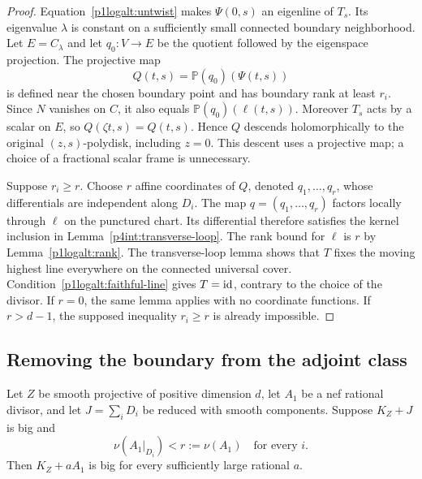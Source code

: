 \begin{proof}
Equation~\eqref{p1logalt:untwist} makes $\Psi(0,s)$ an eigenline of $T_s$.
Its eigenvalue $\lambda$ is constant on a sufficiently small connected
boundary neighborhood.  Let $E=C_\lambda$ and let $q_0:V\to E$ be the
quotient followed by the eigenspace projection.  The projective map
\[
 Q(t,s)=\mathbb P(q_0)(\Psi(t,s))
\]
is defined near the chosen boundary point and has boundary rank at
least $r_i$.  Since $N$ vanishes on $C$, it also equals
$\mathbb P(q_0)(\ell(t,s))$.  Moreover $T_s$ acts by a scalar on $E$,
so $Q(\zeta t,s)=Q(t,s)$.  Hence $Q$ descends holomorphically to the
original $(z,s)$-polydisk, including $z=0$.  This descent uses a
projective map; a choice of a fractional scalar frame is unnecessary.

Suppose $r_i\ge r$.  Choose $r$ affine coordinates of $Q$, denoted
$q_1,\ldots,q_r$, whose differentials are independent along $D_i$.
The map $q=(q_1,\ldots,q_r)$ factors locally through $\ell$ on the
punctured chart.  Its differential therefore satisfies the kernel
inclusion in Lemma~\ref{p4int:transverse-loop}.  The rank bound for
$\ell$ is $r$ by Lemma~\ref{p1logalt:rank}.  The transverse-loop lemma
shows that $T$ fixes the moving highest line everywhere on the connected
universal cover.  Condition~\eqref{p1logalt:faithful-line} gives
$T=\operatorname{id}$, contrary to the choice of the divisor.  If $r=0$, the same
lemma applies with no coordinate functions.  If $r>d-1$, the supposed
inequality $r_i\geq r$ is already impossible.
\end{proof}

\subsection{Removing the boundary from the adjoint class}

\begin{lemma}\label{p1logalt:volume}
Let $Z$ be smooth projective of positive dimension $d$, let $A_1$ be a
nef rational divisor, and let $J=\sum_iD_i$ be reduced with smooth
components.  Suppose $K_Z+J$ is big and
\[
 \nu(A_1|_{D_i})<r:=\nu(A_1)\quad\text{for every }i.
\]
Then $K_Z+aA_1$ is big for every sufficiently large rational $a$.
\end{lemma}

